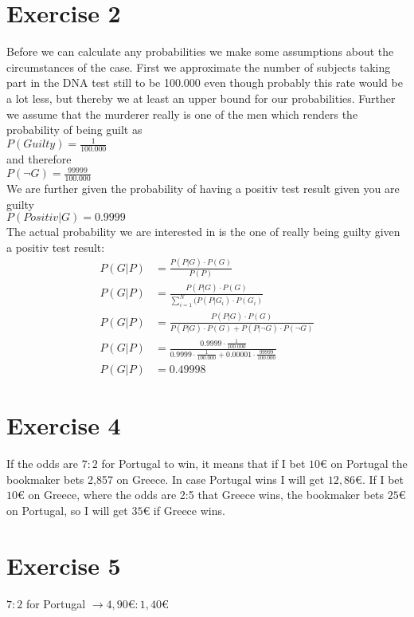 \def \TutorialSheetNumber{3}


\section*{Exercise 2}
Before we can calculate any probabilities we make some assumptions about the circumstances of the case. First we approximate the number of subjects taking part in the DNA test still to be 100.000 even though probably this rate would be a lot less, but thereby we at least an upper bound for our probabilities. Further we assume that the murderer really is one of the men which renders the probability of being guilt as \\ 
$P(Guilty) = \frac{1}{100.000}$\\
and therefore\\
$P(\neg G) = \frac{99999}{100.000}$\\
We are further given the probability of having a positiv test result given you are guilty \\
$P(Positiv|G) = 0.9999 $ \\
The actual probability we are interested in is the one of really being guilty given a positiv test result: \\
\begin{align*}
  P(G | P) & = \frac{P(P|G) \cdot P(G)}{P(P)} \\
  P(G | P) & = \frac{P(P|G) \cdot P(G)}{\sum_{i=1}^{N}(P(P|G_i)\cdot P(G_i)}\\
  P(G | P) & = \frac{P(P|G) \cdot P(G)}{P(P|G)\cdot P(G) + P(P|\neg G)\cdot P(\neg G)} \\
  P(G | P) & = \frac{0.9999 \cdot \frac{1}{100.000}}{0.9999 \cdot \frac{1}{100.000} + 0.00001 \cdot \frac{99999}{100.000}}\\
  P(G | P) & = 0.49998
\end{align*}
 
\section*{Exercise 4}
If the odds are $7 : 2$ for Portugal to win, it means that if I bet $10€$ on Portugal the bookmaker bets 2,857 on Greece. In case Portugal wins I will get $12,86€$.
If I bet $10€$ on Greece, where the odds are 2:5 that Greece wins, the bookmaker bets $25€$ on Portugal, so I will get $35€$ if Greece wins.

\section*{Exercise 5}
$7 : 2$ for Portugal $\rightarrow 4,90€ : 1,40€$



